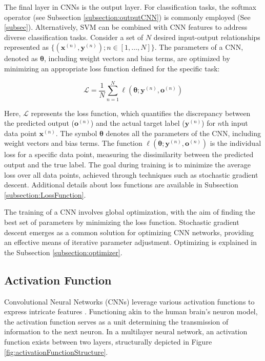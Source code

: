 The final layer in CNNs is the output layer. For classification tasks, the softmax operator (see Subsection \ref{subsection:outputCNN}) is commonly employed (See \ref{subsec}). Alternatively, SVM can be combined with CNN features to address diverse classification tasks. Consider a set of $N$ desired input-output relationships represented as $\{(\mathbf{x}^{(n)}, \mathbf{y}^{(n)}); n \in [1, \ldots, N]\}$. The parameters of a CNN, denoted as $\mathbf{\theta}$, including weight vectors and bias terms, are optimized by minimizing an appropriate loss function defined for the specific task:

\begin{equation}
	\mathcal{L} = \frac{1}{N} \sum_{n=1}^{N} \ell(\mathbf{\theta}; \mathbf{y}^{(n)}, \mathbf{o}^{(n)})
\end{equation}

Here, $\mathcal{L}$ represents the loss function, which quantifies the discrepancy between the predicted output ($\mathbf{o}^{(n)}$) and the actual target label ($\mathbf{y}^{(n)}$) for $n$th input data point $\mathbf{x}^{(n)}$. The symbol $\mathbf{\theta}$ denotes all the parameters of the CNN, including weight vectors and bias terms. The function $\ell(\mathbf{\theta}; \mathbf{y}^{(n)}, \mathbf{o}^{(n)})$ is the individual loss for a specific data point, measuring the dissimilarity between the predicted output and the true label. The goal during training is to minimize the average loss over all data points, achieved through techniques such as stochastic gradient descent. Additional details about loss functions are available in Subsection \ref{subsection:LossFunction}.

The training of a CNN involves global optimization, with the aim of finding the best set of parameters by minimizing the loss function. Stochastic gradient descent emerges as a common solution for optimizing CNN networks, providing an effective means of iterative parameter adjustment. Optimizing is explained in the Subsection \ref{subsection:optimizer}. 

\subsection{Activation Function}
\label{subsection:ActivationFunction}

Convolutional Neural Networks (CNNs) leverage various activation functions to express intricate features \cite{Li:2021}. Functioning akin to the human brain's neuron model, the activation function serves as a unit determining the transmission of information to the next neuron. In a multilayer neural network, an activation function exists between two layers, structurally depicted in Figure \ref{fig:activationFunctionStructure}.

